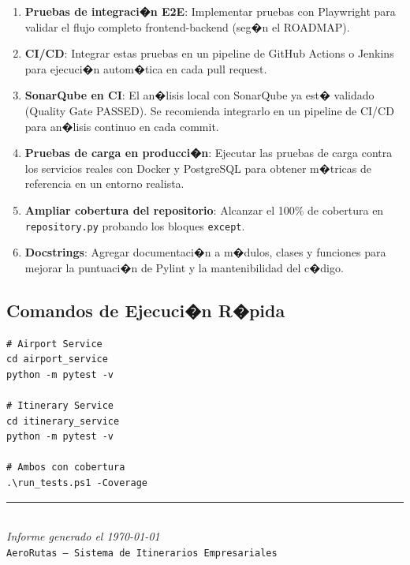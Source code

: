 \documentclass[12pt,a4paper]{article}
\begin{document}
\begin{enumerate}
  \item \textbf{Pruebas de integraci�n E2E}: Implementar pruebas con Playwright
        para validar el flujo completo frontend-backend (seg�n el ROADMAP).
  \item \textbf{CI/CD}: Integrar estas pruebas en un pipeline de GitHub Actions
        o Jenkins para ejecuci�n autom�tica en cada pull request.
  \item \textbf{SonarQube en CI}: El an�lisis local con SonarQube ya est�
        validado (Quality Gate PASSED). Se recomienda integrarlo en un pipeline
        de CI/CD para an�lisis continuo en cada commit.
  \item \textbf{Pruebas de carga en producci�n}: Ejecutar las pruebas de carga
        contra los servicios reales con Docker y PostgreSQL para obtener m�tricas
        de referencia en un entorno realista.
  \item \textbf{Ampliar cobertura del repositorio}: Alcanzar el 100\% de cobertura
        en \texttt{repository.py} probando los bloques \texttt{except}.
  \item \textbf{Docstrings}: Agregar documentaci�n a m�dulos, clases y funciones
        para mejorar la puntuaci�n de Pylint y la mantenibilidad del c�digo.
\end{enumerate}

\subsection{Comandos de Ejecuci�n R�pida}

\begin{lstlisting}[style=bashstyle]
# Airport Service
cd airport_service
python -m pytest -v

# Itinerary Service
cd itinerary_service
python -m pytest -v

# Ambos con cobertura
.\run_tests.ps1 -Coverage
\end{lstlisting}

\vspace{1cm}
\begin{center}
  \rule{0.5\textwidth}{0.5pt}\\[0.3cm]
  {\small \textit{Informe generado el \today}}\\[0.2cm]
  {\small \texttt{AeroRutas -- Sistema de Itinerarios Empresariales}}
\end{center}
\end{document}

